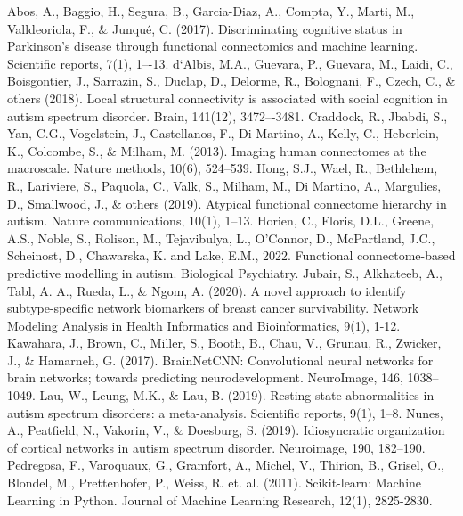 \documentclass[11pt,conference]{IEEEtran}
\begin{document}
\begin{thebibliography}{00}
     {Abos, A., Baggio, H., Segura, B., Garcia-Diaz, A., Compta, Y., Marti, M., Valldeoriola, F., \& Junqué, C. (2017). Discriminating cognitive status in Parkinson's disease through functional connectomics and machine learning. Scientific reports, 7(1), 1–-13.}
     {d`Albis, M.A., Guevara, P., Guevara, M., Laidi, C., Boisgontier, J., Sarrazin, S., Duclap, D., Delorme, R., Bolognani, F., Czech, C., \& others (2018). Local structural connectivity is associated with social cognition in autism spectrum disorder. Brain, 141(12), 3472–-3481.}
     {Craddock, R., Jbabdi, S., Yan, C.G., Vogelstein, J., Castellanos, F., Di Martino, A., Kelly, C., Heberlein, K., Colcombe, S., \& Milham, M. (2013). Imaging human connectomes at the macroscale. Nature methods, 10(6), 524--539.}
     {Hong, S.J., Wael, R., Bethlehem, R., Lariviere, S., Paquola, C., Valk, S., Milham, M., Di Martino, A., Margulies, D., Smallwood, J., \& others (2019). Atypical functional connectome hierarchy in autism. Nature communications, 10(1), 1--13.}
     {Horien, C., Floris, D.L., Greene, A.S., Noble, S., Rolison, M., Tejavibulya, L., O'Connor, D., McPartland, J.C., Scheinost, D., Chawarska, K. and Lake, E.M., 2022. Functional connectome-based predictive modelling in autism. Biological Psychiatry.}
     {Jubair, S., Alkhateeb, A., Tabl, A. A., Rueda, L., \& Ngom, A. (2020). A novel approach to identify subtype-specific network biomarkers of breast cancer survivability. Network Modeling Analysis in Health Informatics and Bioinformatics, 9(1), 1-12.}
     {Kawahara, J., Brown, C., Miller, S., Booth, B., Chau, V., Grunau, R., Zwicker, J., \& Hamarneh, G. (2017). BrainNetCNN: Convolutional neural networks for brain networks; towards predicting neurodevelopment. NeuroImage, 146, 1038--1049.}
     {Lau, W., Leung, M.K., \& Lau, B. (2019). Resting-state abnormalities in autism spectrum disorders: a meta-analysis. Scientific reports, 9(1), 1--8.}
     {Nunes, A., Peatfield, N., Vakorin, V., \& Doesburg, S. (2019). Idiosyncratic organization of cortical networks in autism spectrum disorder. Neuroimage, 190, 182--190.}
     {Pedregosa, F., Varoquaux, G., Gramfort, A., Michel, V., Thirion, B., Grisel, O., Blondel, M., Prettenhofer, P., Weiss, R. et. al. (2011). Scikit-learn: Machine Learning in Python. Journal of Machine Learning Research, 12(1), 2825-2830.}

\end{thebibliography}
\end{document}
